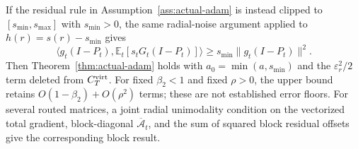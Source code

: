 \begin{corollary}
If the residual rule in Assumption~\ref{ass:actual-adam} is instead clipped
to $[s_{\min},s_{\max}]$ with $s_{\min}>0$, the same radial-noise argument
applied to $h(r)=s(r)-s_{\min}$ gives
\begin{equation}
 \langle g_t(I-P_t),\mathbb E_t[s_tG_t(I-P_t)]\rangle
 \ge s_{\min}\|g_t(I-P_t)\|^2.
\end{equation}
Then Theorem~\ref{thm:actual-adam} holds with
$a_0=\min(a,s_{\min})$ and the $\varepsilon_r^2/2$ term deleted from
$C_T^{\rm virt}$.
For fixed $\beta_2<1$ and fixed $\rho>0$, the upper bound retains
$O(1-\beta_2)+O(\rho^2)$ terms; these are not established error floors.
For several routed matrices, a joint
radial unimodality condition on the vectorized total gradient, block-diagonal
$\overline{\mathcal A}_t$, and the sum of squared block residual offsets
give the corresponding block result.
\end{corollary}
